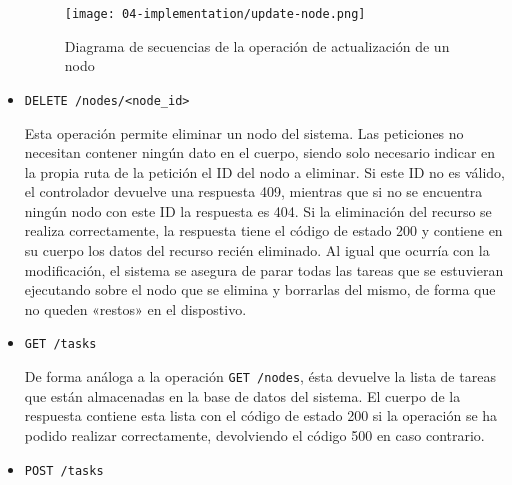 \begin{itemize}
          \begin{figure}
              \centering
              \texttt{[image: 04-implementation/update-node.png]}
              \caption{Diagrama de secuencias de la operación de actualización de un nodo}
              \label{fig:04-update_node}
          \end{figure}

    \item \texttt{DELETE /nodes/<node\_id>}

          Esta operación permite eliminar un nodo del sistema. Las peticiones no
          necesitan contener ningún dato en el cuerpo, siendo solo necesario
          indicar en la propia ruta de la petición el ID del nodo a eliminar. Si
          este ID no es válido, el controlador devuelve una respuesta 409,
          mientras que si no se encuentra ningún nodo con este ID la respuesta
          es 404. Si la eliminación del recurso se realiza correctamente, la
          respuesta tiene el código de estado 200 y contiene en su cuerpo los
          datos del recurso recién eliminado. Al igual que ocurría con la
          modificación, el sistema se asegura de parar todas las tareas que se
          estuvieran ejecutando sobre el nodo que se elimina y borrarlas del
          mismo, de forma que no queden «restos» en el dispostivo.

    \item \texttt{GET /tasks}

          De forma análoga a la operación \texttt{GET /nodes}, ésta devuelve la
          lista de tareas que están almacenadas en la base de datos del sistema.
          El cuerpo de la respuesta contiene esta lista con el código de estado
          200 si la operación se ha podido realizar correctamente, devolviendo
          el código 500 en caso contrario.

    \item \texttt{POST /tasks}


\end{itemize}
